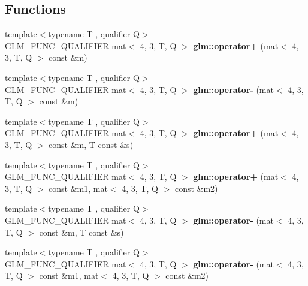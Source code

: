 \subsection*{Functions}
\begin{DoxyCompactItemize}
\item 
\mbox{\label{type__mat4x3_8inl_ac4cf1dbfc403dbb4280e25e877decac6}} 
{\footnotesize template$<$typename T , qualifier Q$>$ }\\G\+L\+M\+\_\+\+F\+U\+N\+C\+\_\+\+Q\+U\+A\+L\+I\+F\+I\+ER mat$<$ 4, 3, T, Q $>$ {\bfseries glm\+::operator+} (mat$<$ 4, 3, T, Q $>$ const \&m)
\item 
\mbox{\label{type__mat4x3_8inl_a01c8293d28706150e4bf3070f35047fa}} 
{\footnotesize template$<$typename T , qualifier Q$>$ }\\G\+L\+M\+\_\+\+F\+U\+N\+C\+\_\+\+Q\+U\+A\+L\+I\+F\+I\+ER mat$<$ 4, 3, T, Q $>$ {\bfseries glm\+::operator-\/} (mat$<$ 4, 3, T, Q $>$ const \&m)
\item 
\mbox{\label{type__mat4x3_8inl_a3a0caf213d8d62030b83697268efee63}} 
{\footnotesize template$<$typename T , qualifier Q$>$ }\\G\+L\+M\+\_\+\+F\+U\+N\+C\+\_\+\+Q\+U\+A\+L\+I\+F\+I\+ER mat$<$ 4, 3, T, Q $>$ {\bfseries glm\+::operator+} (mat$<$ 4, 3, T, Q $>$ const \&m, T const \&s)
\item 
\mbox{\label{type__mat4x3_8inl_a1cd9ee2deb30f9b9a468002057616fbd}} 
{\footnotesize template$<$typename T , qualifier Q$>$ }\\G\+L\+M\+\_\+\+F\+U\+N\+C\+\_\+\+Q\+U\+A\+L\+I\+F\+I\+ER mat$<$ 4, 3, T, Q $>$ {\bfseries glm\+::operator+} (mat$<$ 4, 3, T, Q $>$ const \&m1, mat$<$ 4, 3, T, Q $>$ const \&m2)
\item 
\mbox{\label{type__mat4x3_8inl_af7b8e989ba904e907793068422a05421}} 
{\footnotesize template$<$typename T , qualifier Q$>$ }\\G\+L\+M\+\_\+\+F\+U\+N\+C\+\_\+\+Q\+U\+A\+L\+I\+F\+I\+ER mat$<$ 4, 3, T, Q $>$ {\bfseries glm\+::operator-\/} (mat$<$ 4, 3, T, Q $>$ const \&m, T const \&s)
\item 
\mbox{\label{type__mat4x3_8inl_a45c4e005f0d19b2eb0c8b8b3d410abd7}} 
{\footnotesize template$<$typename T , qualifier Q$>$ }\\G\+L\+M\+\_\+\+F\+U\+N\+C\+\_\+\+Q\+U\+A\+L\+I\+F\+I\+ER mat$<$ 4, 3, T, Q $>$ {\bfseries glm\+::operator-\/} (mat$<$ 4, 3, T, Q $>$ const \&m1, mat$<$ 4, 3, T, Q $>$ const \&m2)

\end{DoxyCompactItemize}
